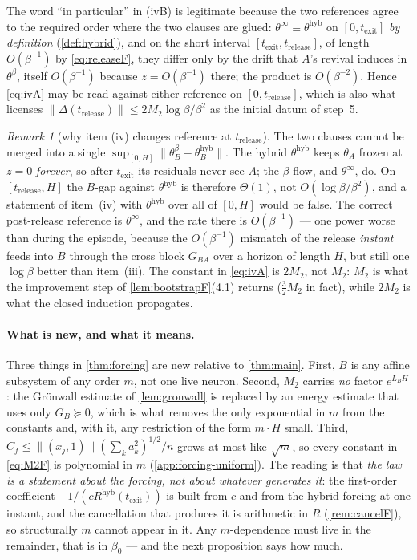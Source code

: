\documentclass[11pt]{article}
\theoremstyle{definition}
\theoremstyle{remark}
\newtheorem{remark}[remark]{Remark}
\newcommand{\texit}{t_{\mathrm{exit}}}
\newcommand{\trel}{t_{\mathrm{release}}}
\newcommand{\hyb}{\mathrm{hyb}}
\begin{document}
The word ``in particular'' in (ivB) is legitimate because the two references
agree to the required order where the two clauses are glued:
$\theta^\infty\equiv\theta^{\hyb}$ on $[0,\texit]$ \emph{by definition}
(\cref{def:hybrid}), and on the short interval $[\texit,\trel]$, of length
$O(\beta^{-1})$ by \eqref{eq:releaseF}, they differ only by the drift that $A$'s
revival induces in $\theta^\beta$, itself $O(\beta^{-1})$ because
$z=O(\beta^{-1})$ there; the product is $O(\beta^{-2})$. Hence \eqref{eq:ivA}
may be read against either reference on $[0,\trel]$, which is also what licenses
$\|\Delta(\trel)\|\le 2M_2\log\beta/\beta^2$ as the initial datum of step~5.

\begin{remark}[why item (iv) changes reference at $\trel$]\label{rem:ivrefF}
The two clauses cannot be merged into a single
$\sup_{[0,H]}\|\theta_B^\beta-\theta_B^{\hyb}\|$. The hybrid $\theta^{\hyb}$
keeps $\theta_A$ frozen at $z=0$ \emph{forever}, so after $\texit$ its residuals
never see $A$; the $\beta$-flow, and $\theta^\infty$, do. On $[\trel,H]$ the
$B$-gap against $\theta^{\hyb}$ is therefore $\Theta(1)$, not
$O(\log\beta/\beta^2)$, and a statement of item~(iv) with $\theta^{\hyb}$ over
all of $[0,H]$ would be false. The correct post-release reference is
$\theta^\infty$, and the rate there is $O(\beta^{-1})$ --- one power worse than
during the episode, because the $O(\beta^{-1})$ mismatch of the release
\emph{instant} feeds into $B$ through the cross block $G_{BA}$ over a horizon of
length $H$, but still one $\log\beta$ better than item~(iii). The constant in
\eqref{eq:ivA} is $2M_2$, not $M_2$: $M_2$ is what the improvement step of
\cref{lem:bootstrapF}(4.1) returns ($\tfrac32M_2$ in fact), while $2M_2$ is what
the closed induction propagates.
\end{remark}

\paragraph{What is new, and what it means.} Three things in \cref{thm:forcing}
are new relative to \cref{thm:main}. First, $B$ is any affine subsystem of any
order $m$, not one live neuron. Second, $M_2$ carries \emph{no} factor
$e^{L_BH}$: the Gr\"onwall estimate of \cref{lem:gronwall} is replaced by an
energy estimate that uses only $G_B\succeq0$, which is what removes the only
exponential in $m$ from the constants and, with it, any restriction of the form
$m\cdot H$ small. Third, $C_f\le\|(x_j,1)\|(\sum_ka_k^2)^{1/2}/n$ grows at most
like $\sqrt m$, so every constant in \eqref{eq:M2F} is polynomial in $m$
(\cref{app:forcing-uniform}). The reading is that \emph{the law is a statement
about the forcing, not about whatever generates it}: the first-order
coefficient $-1/(cR^{\hyb}(\texit))$ is built from $c$ and from the hybrid
forcing at one instant, and the cancellation that produces it is arithmetic in
$R$ (\cref{rem:cancelF}), so structurally $m$ cannot appear in it. Any
$m$-dependence must live in the remainder, that is in $\beta_0$ --- and the next
proposition says how much.
\end{document}
